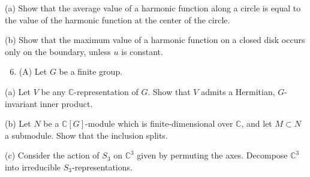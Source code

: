 \documentclass[10pt]{article}
\begin{document}
(a) Show that the average value of a harmonic function along a circle is equal to the value of the harmonic function at the center of the circle.

(b) Show that the maximum value of a harmonic function on a closed disk occurs only on the boundary, unless $u$ is constant.

\begin{enumerate}
  \setcounter{enumi}{5}
  \item (A) Let $G$ be a finite group.
\end{enumerate}

(a) Let $V$ be any $\mathbb{C}$-representation of $G$. Show that $V$ admits a Hermitian, $G$-invariant inner product.

(b) Let $N$ be a $\mathbb{C}[G]$-module which is finite-dimensional over $\mathbb{C}$, and let $M \subset N$ a submodule. Show that the inclusion splits.

(c) Consider the action of $S_{3}$ on $\mathbb{C}^{3}$ given by permuting the axes. Decompose $\mathbb{C}^{3}$ into irreducible $S_{3}$-representations.
\end{document}
